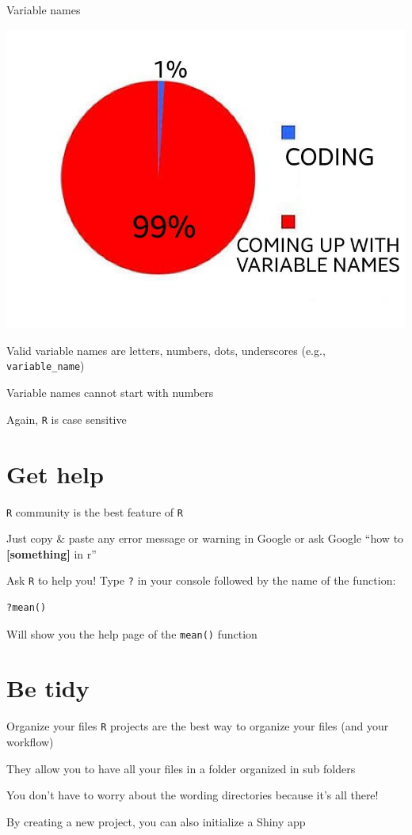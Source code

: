 \documentclass[
  ignorenonframetext,
]{beamer}
\begin{document}
\begin{frame}[fragile]{Variable names}
\protect\hypertarget{variable-names}{}
\begin{center}\includegraphics[width=0.45\linewidth]{img/meme} \end{center}

Valid variable names are letters, numbers, dots, underscores (e.g.,
\texttt{variable\_name})

Variable names cannot start with numbers

Again, \texttt{R} is case sensitive
\end{frame}

\hypertarget{get-help}{%
\section{Get help}\label{get-help}}

\begin{frame}[fragile]{}
\protect\hypertarget{section-3}{}
\texttt{R} community is the best feature of \texttt{R}

Just copy \& paste any error message or warning in Google or ask Google
``how to \textbf{{[}something{]}} in r''

Ask \texttt{R} to help you! Type \texttt{?} in your console followed by
the name of the function:

\begin{verbatim}
?mean()
\end{verbatim}

Will show you the help page of the \texttt{mean()} function
\end{frame}

\hypertarget{be-tidy}{%
\section{Be tidy}\label{be-tidy}}

\begin{frame}[fragile]{Organize your files}
\protect\hypertarget{organize-your-files}{}
\texttt{R} projects are the best way to organize your files (and your
workflow)

They allow you to have all your files in a folder organized in sub
folders

You don't have to worry about the wording directories because it's all
there!

By creating a new project, you can also initialize a Shiny app
\end{frame}
\end{document}
